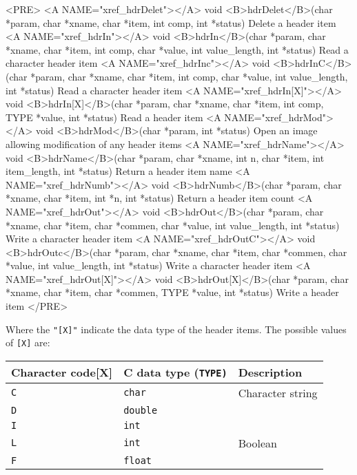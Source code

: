 \documentclass[twoside,11pt]{article}
\renewcommand{\_}{\texttt{\symbol{95}}}
\begin{document}
\begin{rawhtml}
<PRE>
<A NAME="xref_hdrDelet"></A>
  void <B>hdrDelet</B>(char *param, char *xname, char *item, int comp, int *status) 
     Delete a header item 
<A NAME="xref_hdrIn"></A>
  void <B>hdrIn</B>(char *param, char *xname, char *item, int comp, char *value, int value_length, int *status) 
     Read a character header item 
<A NAME="xref_hdrInc"></A>
  void <B>hdrInC</B>(char *param, char *xname, char *item, int comp, char *value, int value_length, int *status) 
     Read a character header item 
<A NAME="xref_hdrIn[X]"></A>
  void <B>hdrIn[X]</B>(char *param, char *xname, char *item, int comp, TYPE *value, int *status) 
     Read a header item 
<A NAME="xref_hdrMod"></A>
  void <B>hdrMod</B>(char *param, int *status) 
     Open an image allowing modification of any header items 
<A NAME="xref_hdrName"></A>
  void <B>hdrName</B>(char *param, char *xname, int n, char *item, int item_length, int *status) 
     Return a header item name 
<A NAME="xref_hdrNumb"></A>
  void <B>hdrNumb</B>(char *param, char *xname, char *item, int *n, int *status) 
     Return a header item count 
<A NAME="xref_hdrOut"></A>
  void <B>hdrOut</B>(char *param, char *xname, char *item, char *commen, char *value,   int value_length, int *status) 
     Write a character header item 
<A NAME="xref_hdrOutC"></A>
  void <B>hdrOutc</B>(char *param, char *xname, char *item, char *commen, char *value,   int value_length, int *status) 
     Write a character header item 
<A NAME="xref_hdrOut[X]"></A>
  void <B>hdrOut[X]</B>(char *param, char *xname, char *item, char *commen, TYPE *value,   int *status) 
     Write a header item 
</PRE>
\end{rawhtml}
\label{HDRCdatatypes}
Where the \texttt{"[X]"} indicate the data type of the header items. 
The possible values of \texttt{[X]} are:
\begin{small}
\begin{center}
\begin{tabular}{||l|l|l||}
\hline
Character code[X] & C data type (\texttt{TYPE)} &  Description      \\
\hline
 \texttt{C}          & \texttt{char}               &  Character string \\
 \texttt{D}          & \texttt{double}             &  \\
 \texttt{I}          & \texttt{int}                &  \\
 \texttt{L}          & \texttt{int}                &  Boolean          \\
 \texttt{F}          & \texttt{float}              &  \\
\hline
\end{tabular}
\end{center}
\end{small}
\end{document}
